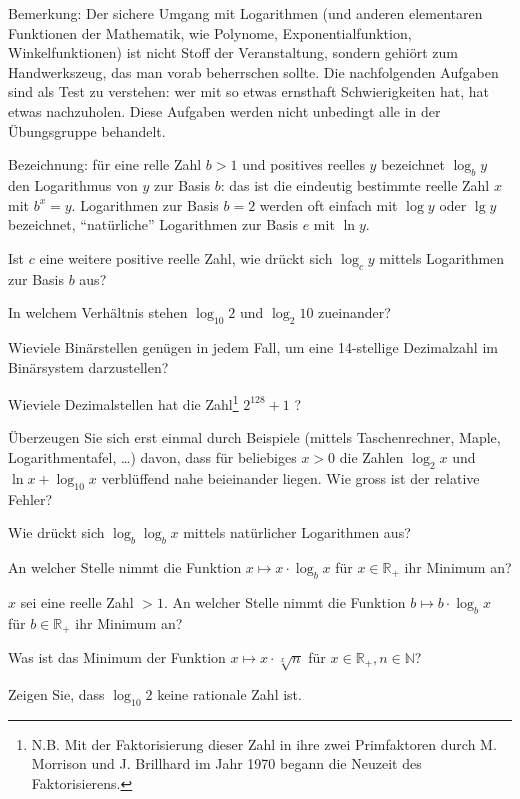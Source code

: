 
Bemerkung: Der sichere Umgang mit Logarithmen (und anderen elementaren
Funktionen der Mathematik, wie Polynome, Exponentialfunktion,
Winkelfunktionen) ist nicht Stoff der Veranstaltung,
sondern gehiört zum Handwerkszeug, das man vorab beherrschen sollte.
Die nachfolgenden Aufgaben sind als Test zu verstehen: wer mit so etwas
ernsthaft Schwierigkeiten hat, hat etwas nachzuholen.
Diese Aufgaben werden nicht unbedingt alle in der Übungsgruppe behandelt.

Bezeichnung: für eine relle Zahl $b>1$ und positives reelles $y$ bezeichnet
$\log_b y$  den Logarithmus von $y$ zur Basis $b$: das ist die eindeutig
bestimmte reelle Zahl $x$ mit $b^x = y$.  Logarithmen zur Basis $b=2$ werden
oft einfach mit $\log y$ oder $\lg y$ bezeichnet, ``natürliche'' Logarithmen
zur Basis $e$ mit $\ln y$.

\begin{flushenum}
\item
Ist $c$ eine weitere positive reelle Zahl, wie  drückt sich $\log_c y$
mittels Logarithmen zur Basis $b$ aus?
\item
In welchem Verhältnis stehen $\log_{10}2$ und $\log_2 10$ zueinander?
\item
Wieviele Binärstellen genügen in jedem Fall, 
um eine 14-stellige Dezimalzahl im Binärsystem darzustellen?
\item
Wieviele Dezimalstellen hat die Zahl\footnote{
N.B. Mit der Faktorisierung dieser Zahl in ihre zwei Primfaktoren
durch M. Morrison und J. Brillhard 
im Jahr 1970 begann die Neuzeit des Faktorisierens.} $2^{128}+1$ ?
\item
Überzeugen Sie sich erst einmal durch Beispiele 
(mittels Taschenrechner, Maple, Logarithmentafel, \ldots) davon, 
dass für beliebiges $x >0$ die Zahlen
$\log_2 x$ und $\ln x + \log_{10} x$ verblüffend nahe beieinander liegen. 
Wie gross ist der relative Fehler?
\item
Wie drückt sich $\log_b \log_b x$ mittels natürlicher Logarithmen aus?
\item
An welcher Stelle nimmt die Funktion 
$x \mapsto x \cdot \log_b x$ für $x \in \mathbb{R}_+$
ihr Minimum an? 
\item
$x$ sei eine reelle Zahl $>1$. An welcher Stelle nimmt die Funktion 
$b \mapsto b \cdot \log_b x$ für $b \in \mathbb{R}_+$
ihr Minimum an? 
\item
Was ist das Minimum der Funktion 
$x \mapsto x \cdot \sqrt[x]{n}$ für $x \in \mathbb{R}_+, n \in \mathbb{N}$?
\item
Zeigen Sie, dass $\log_{10} 2$ keine rationale Zahl ist.

\end{flushenum}


